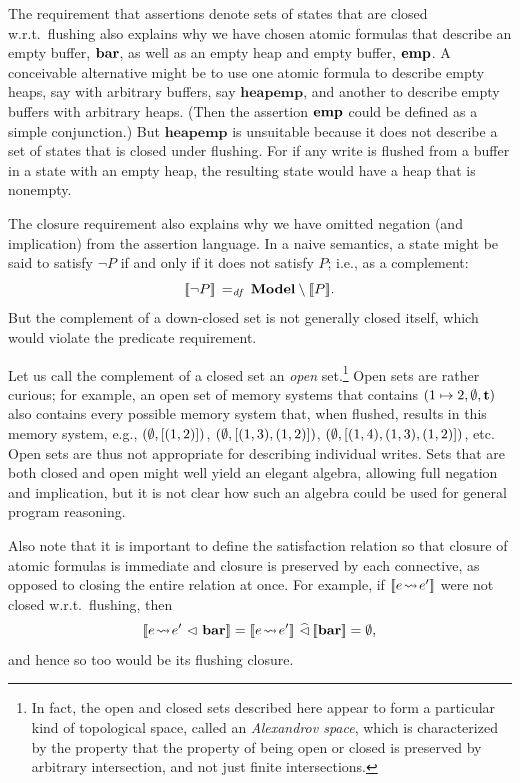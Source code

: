 \documentclass[11pt]{report}         %
\begin{document}
The requirement that assertions denote sets of states that are closed w.r.t.\ flushing also explains why we have chosen atomic formulas that describe an empty buffer, $\mathbf{bar}$, as well as an empty heap and empty buffer, $\mathbf{emp}$. A conceivable alternative might be to use one atomic formula to describe empty heaps, say with arbitrary buffers, say $\mathbf{heapemp}$, and another to describe empty buffers with arbitrary heaps. (Then the assertion $\mathbf{emp}$ could be defined as a simple conjunction.) But $\mathbf{heapemp}$ is unsuitable because it does not describe a set of states that is closed under flushing. For if any write is flushed from a buffer in a state with an empty heap, the resulting state would have a heap that is nonempty. 

The closure requirement also explains why we have omitted negation (and implication) from the assertion language. In a naive semantics, a state might be said to satisfy $\neg P$ if and only if it does not satisfy $P$; i.e., as a complement: \[ [\![\neg P]\!] \operatorname{\;=_{\mathit{df}}\;} \mathbf{Model} \setminus [\![P]\!]. \] But the complement of a down-closed set is not generally closed itself, which would violate the predicate requirement. 

Let us call the complement of a closed set an \emph{open} set.\footnote{In fact, the open and closed sets described here appear to form a particular kind of topological space, called an \emph{Alexandrov space}, which is characterized by the property that the property of being open or closed is preserved by arbitrary intersection, and not just finite intersections.} Open sets are rather curious; for example, an open set of memory systems that contains $(1 \mapsto 2,\operatorname{\emptyset},\mathbf{t})$ also contains every possible memory system that, when flushed, results in this memory system, e.g., $(\operatorname{\emptyset}, \left[(1,2)\right])$, $(\operatorname{\emptyset}, \left[(1,3),(1,2)\right])$, $(\operatorname{\emptyset}, \left[(1,4),(1,3),(1,2)\right])$, etc. Open sets are thus not appropriate for describing individual writes. Sets that are both closed and open might well yield an elegant algebra, allowing full negation and implication, but it is not clear how such an algebra could be used for general program reasoning. 

Also note that it is important to define the satisfaction relation so that closure of atomic formulas is immediate and closure is preserved by each connective, as opposed to closing the entire relation at once. For example, if $[\![e \!\leadsto\! e']\!]$ were not closed w.r.t.\ flushing, then \[\pred{e \fwriteu e' \fseq \fbaru} = \pred{e \fwriteu e'} \mseq \pred{\fbaru} = \nil,\] and hence so too would be its flushing closure.  
\end{document}
